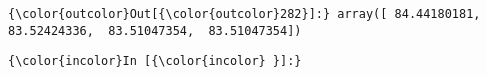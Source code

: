 \documentclass[11pt]{article}
\begin{document}
            \begin{Verbatim}[commandchars=\\\{\}]
{\color{outcolor}Out[{\color{outcolor}282}]:} array([ 84.44180181,  83.52424336,  83.51047354,  83.51047354])
\end{Verbatim}
        
    \begin{Verbatim}[commandchars=\\\{\}]
{\color{incolor}In [{\color{incolor} }]:} 
\end{Verbatim}


    
    
    
    
\end{document}
